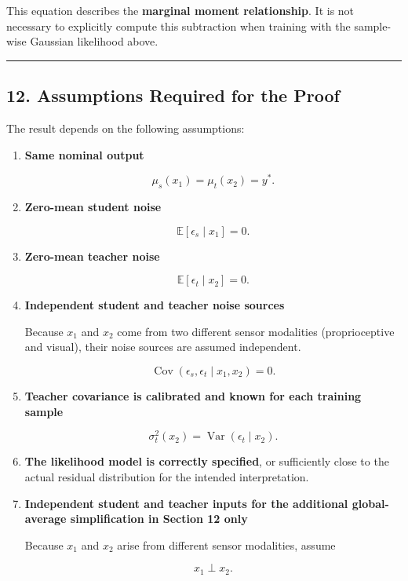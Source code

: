 This equation describes the \textbf{marginal moment relationship}. It is
not necessary to explicitly compute this subtraction when training with
the sample-wise Gaussian likelihood above.

\begin{center}\rule{0.5\linewidth}{0.5pt}\end{center}

\subsection{12. Assumptions Required for the
Proof}\label{assumptions-required-for-the-proof}

The result depends on the following assumptions:

\begin{enumerate}
\def\labelenumi{\arabic{enumi}.}
\item
  \textbf{Same nominal output}

  \[
  \mu_s(x_1)=\mu_t(x_2)=y^*.
  \]
\item
  \textbf{Zero-mean student noise}

  \[
  \mathbb{E}[\epsilon_s\mid x_1]=0.
  \]
\item
  \textbf{Zero-mean teacher noise}

  \[
  \mathbb{E}[\epsilon_t\mid x_2]=0.
  \]
\item
  \textbf{Independent student and teacher noise sources}

  Because \(x_1\) and \(x_2\) come from two different sensor modalities
  (proprioceptive and visual), their noise sources are assumed
  independent.

  \[
  \operatorname{Cov}(\epsilon_s,\epsilon_t\mid x_1,x_2)=0.
  \]
\item
  \textbf{Teacher covariance is calibrated and known for each training
  sample}

  \[
  \sigma_t^2(x_2)
  =
  \operatorname{Var}(\epsilon_t\mid x_2).
  \]
\item
  \textbf{The likelihood model is correctly specified}, or sufficiently
  close to the actual residual distribution for the intended
  interpretation.
\item
  \textbf{Independent student and teacher inputs for the additional
  global-average simplification in Section 12 only}

  Because \(x_1\) and \(x_2\) arise from different sensor modalities,
  assume

  \[
  x_1\perp x_2.
  \]
\end{enumerate}

